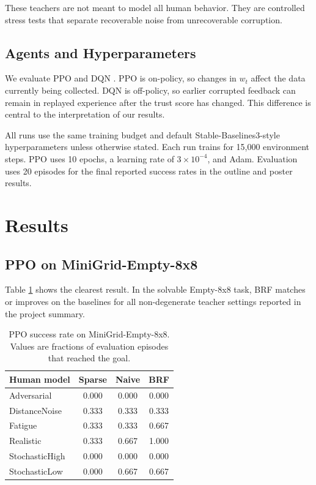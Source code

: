 \documentclass[11pt]{article}
\begin{document}
These teachers are not meant to model all human behavior. They are controlled stress tests that separate recoverable noise from unrecoverable corruption.

\subsection{Agents and Hyperparameters}

We evaluate PPO \cite{schulman2017proximal} and DQN \cite{mnih2015human}. PPO is on-policy, so changes in $w_t$ affect the data currently being collected. DQN is off-policy, so earlier corrupted feedback can remain in replayed experience after the trust score has changed. This difference is central to the interpretation of our results.

All runs use the same training budget and default Stable-Baselines3-style hyperparameters \cite{raffin2021stable} unless otherwise stated. Each run trains for 15,000 environment steps. PPO uses 10 epochs, a learning rate of $3\times 10^{-4}$, and Adam. Evaluation uses 20 episodes for the final reported success rates in the outline and poster results.

\section{Results}

\subsection{PPO on MiniGrid-Empty-8x8}

Table \ref{tab:ppoempty} shows the clearest result. In the solvable Empty-8x8 task, BRF matches or improves on the baselines for all non-degenerate teacher settings reported in the project summary.

\begin{table}[h]
\centering
\caption{PPO success rate on MiniGrid-Empty-8x8. Values are fractions of evaluation episodes that reached the goal.}
\label{tab:ppoempty}
\begin{tabular}{lccc}
\toprule
Human model & Sparse & Naive & BRF \\
\midrule
Adversarial & 0.000 & 0.000 & 0.000 \\
DistanceNoise & 0.333 & 0.333 & 0.333 \\
Fatigue & 0.333 & 0.333 & 0.667 \\
Realistic & 0.333 & 0.667 & 1.000 \\
StochasticHigh & 0.000 & 0.000 & 0.000 \\
StochasticLow & 0.000 & 0.667 & 0.667 \\
\bottomrule
\end{tabular}
\end{table}
\end{document}
